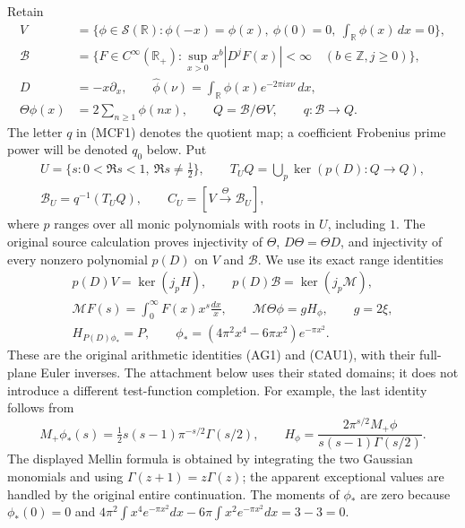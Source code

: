 Retain
\[
\begin{split}
V&=\{\phi\in\mathcal S(\mathbb R):\phi(-x)=\phi(x),\
                  \phi(0)=0,\ \int_{\mathbb R}\phi(x)\,dx=0\},\\
\mathscr B&=\{F\in C^\infty(\mathbb R_+):
 \sup_{x>0}x^b|D^jF(x)|<\infty\quad(b\in\mathbb Z,j\geq0)\},\\
D&=-x\partial_x,\qquad
\widehat\phi(\nu)=\int_{\mathbb R}\phi(x)e^{-2\pi ix\nu}\,dx,\\
\Theta\phi(x)&=2\sum_{n\geq1}\phi(nx),\qquad
Q=\mathscr B/\Theta V,\qquad q:\mathscr B\longrightarrow Q.
\end{split}
\tag{MCF1}
\]
The letter $q$ in (MCF1) denotes the quotient map; a coefficient Frobenius
prime power will be denoted $q_0$ below.  Put
\[
\begin{gathered}
U=\{s:0<\Re s<1,\ \Re s\ne\tfrac12\},\qquad
T_UQ=\bigcup_p\ker(p(D):Q\to Q),\\
\mathscr B_U=q^{-1}(T_UQ),\qquad
C_U=[V\xrightarrow\Theta\mathscr B_U],
\end{gathered}
\tag{MCF2}
\]
where $p$ ranges over all monic polynomials with roots in $U$, including $1$.
The original source calculation proves injectivity of $\Theta$,
$D\Theta=\Theta D$, and injectivity of every nonzero polynomial $p(D)$
on $V$ and $\mathscr B$.  We use its exact range identities
\[
\begin{gathered}
p(D)V=\ker(j_pH),\qquad
p(D)\mathscr B=\ker(j_p\mathcal M),\\
\mathcal MF(s)=\int_0^\infty F(x)x^s\frac{dx}{x},\qquad
\mathcal M\Theta\phi=gH_\phi,\qquad g=2\xi,\\
H_{P(D)\phi_*}=P,\qquad
\phi_*=(4\pi^2x^4-6\pi x^2)e^{-\pi x^2}.
\end{gathered}
\tag{MCF3}
\]
These are the original arithmetic identities (AG1) and (CAU1), with their
full-plane Euler inverses.  The attachment below uses their stated domains;
it does not introduce a different test-function completion.  For example,
the last identity follows from
\[
M_+\phi_*(s)=\tfrac12s(s-1)\pi^{-s/2}\Gamma(s/2),\qquad
H_\phi=\frac{2\pi^{s/2}M_+\phi}{s(s-1)\Gamma(s/2)}.
\]
The displayed Mellin formula is obtained by integrating the two Gaussian
monomials and using $\Gamma(z+1)=z\Gamma(z)$; the apparent exceptional
values are handled by the original entire continuation.  The moments of
$\phi_*$ are zero because $\phi_*(0)=0$ and
$4\pi^2\int x^4e^{-\pi x^2}dx-6\pi\int x^2e^{-\pi x^2}dx=3-3=0$.

